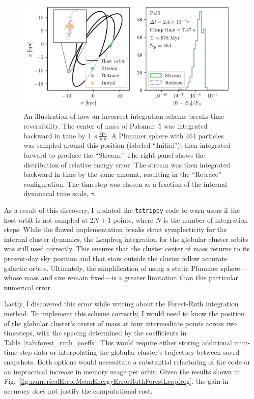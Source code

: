         \begin{figure}
            \centering
            \includegraphics[width=\linewidth]{images/NumericalErrorStreamRetrace_Pal5_Nsteps_32768_stepsPerTau_420.png}
            \caption{An illustration of how an incorrect integration scheme breaks time reversibility. The center of mass of Palomar~5 was integrated backward in time by 1~$\mathrm{s}~\frac{\mathrm{kpc}}{\mathrm{km}}$. A Plummer sphere with 464 particles was sampled around this position (labeled “Initial”), then integrated forward to produce the “Stream.” The right panel shows the distribution of relative energy error. The stream was then integrated backward in time by the same amount, resulting in the “Retrace” configuration. The timestep was chosen as a fraction of the internal dynamical time scale, $\tau$.}
            \label{fig:NumericalErrorStreamRetrace_Pal5_Nsteps_32768_stepsPerTau_420}
        \end{figure}
        As a result of this discovery, I updated the \texttt{tstrippy} code to warn users if the host orbit is not sampled at $2N + 1$ points, where $N$ is the number of integration steps. While the flawed implementation breaks strict symplecticity for the internal cluster dynamics, the Leapfrog integration for the globular cluster orbits was still used correctly. This ensures that the cluster center of mass returns to its present-day sky position and that stars outside the cluster follow accurate galactic orbits. Ultimately, the simplification of using a static Plummer sphere—whose mass and size remain fixed—is a greater limitation than this particular numerical error.

        Lastly, I discovered this error while writing about the Forest-Ruth integration method. To implement this scheme correctly, I would need to know the position of the globular cluster's center of mass at four intermediate points across two timesteps, with the spacing determined by the coefficients in Table~\ref{tab:forest_ruth_coeffs}. This would require either storing additional mini-time-step data or interpolating the globular cluster's trajectory between saved snapshots. Both options would necessitate a substantial refactoring of the code or an impractical increase in memory usage per orbit. Given the results shown in Fig.~\ref{fig:numericalErrorMeanEnergyErrorRuthForestLeapfrog}, the gain in accuracy does not justify the computational cost.


